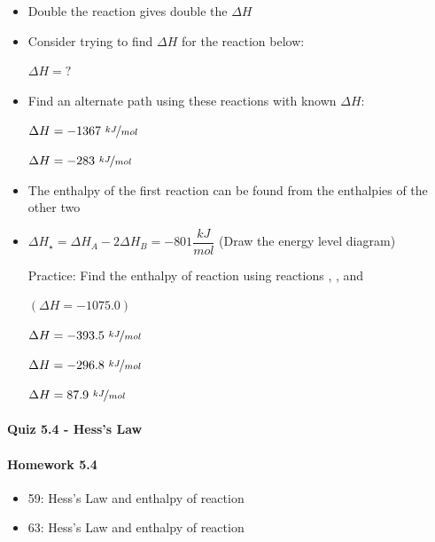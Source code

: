 \documentclass[12pt, openany, letterpaper]{memoir}
\begin{document}
\begin{itemize}
\begin{itemize}
    \item Double the reaction gives double the $\Delta H$
    \item Consider trying to find $\Delta H$ for the reaction below:

          \circled{$\star$}  \hspace{2em} $\Delta H = ?$
    \item Find an alternate path using these reactions with known $\Delta H$:

            \hspace{2em} $\Delta H=-1367~\nicefrac{kJ}{mol}$

            \hspace{2em} $\Delta H=-283~\nicefrac{kJ}{mol}$
    \item The enthalpy of the first reaction can be found from the enthalpies of the other two
    \item $\Delta H_{\star} = \Delta H_A - 2 \Delta H_B = -801\dfrac{kJ}{mol}$ \hspace{1em} (Draw the energy level diagram)

          Practice: Find the enthalpy of reaction \circled{$\star$} using reactions , , and 

          \circled{$\star$}  \hspace{2em} $\left(\Delta H = -1075.0\right)$

            \hspace{2em} $\Delta H=-393.5~\nicefrac{kJ}{mol}$

            \hspace{2em} $\Delta H=-296.8~\nicefrac{kJ}{mol}$

            \hspace{2em} $\Delta H = 87.9~\nicefrac{kJ}{mol}$
  \end{itemize}
\end{itemize}

\paragraph*{Quiz 5.4 - Hess's Law}
\paragraph*{Homework 5.4}
\begin{itemize}
  \item 59: Hess's Law and enthalpy of reaction
  \item 63: Hess's Law and enthalpy of reaction
\end{itemize}
\end{document}
